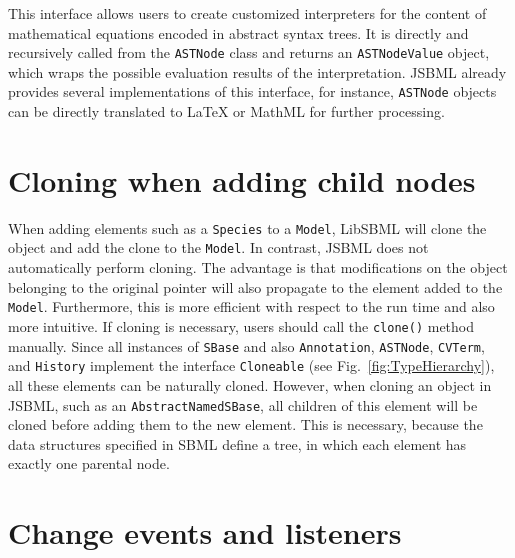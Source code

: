 \documentclass[
  letterpaper,
  11pt,
  headsepline,
  pointlessnumbers,
  tablecaptionabove,
  headinclude,
  appendixprefix,
  idxtotoc,
  bibtotoc,
  titlepage
]{scrartcl}
\begin{document}
This interface allows users to create customized interpreters for the
content of mathematical equations encoded in abstract syntax trees. It
is directly and recursively called from the \verb!ASTNode! class and returns
an \verb!ASTNodeValue! object, which wraps the possible evaluation results of
the interpretation. JSBML already provides several implementations of
this interface, for instance, \verb!ASTNode! objects can be directly translated
to LaTeX or MathML for further processing.

\section{Cloning when adding child nodes}

When adding elements such as a \verb!Species! to a \verb!Model!, LibSBML will
clone the object and add the clone to the \verb!Model!. In contrast, JSBML does
not automatically perform cloning. The advantage is that modifications on the
object belonging to the original pointer will also propagate to the element
added to the \verb!Model!. Furthermore, this is more efficient with respect to
the run time and also more intuitive. If cloning is necessary, users should call
the \verb!clone()! method manually. Since all instances of \verb!SBase! and also
\verb!Annotation!, \verb!ASTNode!, \verb!CVTerm!, and \verb!History! implement
the interface \verb!Cloneable! (see Fig.~\vref{fig:TypeHierarchy}), all these
elements can be naturally cloned. However, when cloning an object in JSBML, such
as an \verb!AbstractNamedSBase!, all children of this element will be cloned
before adding them to the new element. This is necessary, because the data
structures specified in SBML define a tree, in which each element has exactly
one parental node.


\section{Change events and listeners}
\end{document}
